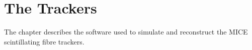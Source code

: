 \chapter{The Trackers}
\label{chapter:tracker}

The chapter describes the software used to simulate and reconstruct the MICE scintillating fibre trackers.






% 
% 
% 